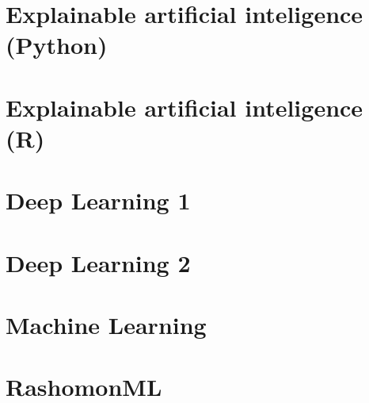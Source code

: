 \documentclass[
]{krantz}
\begin{document}
\hypertarget{explainable-artificial-inteligence-python}{%
\section{Explainable artificial inteligence (Python)}\label{explainable-artificial-inteligence-python}}

\hypertarget{explainable-artificial-inteligence-r}{%
\section{Explainable artificial inteligence (R)}\label{explainable-artificial-inteligence-r}}

\hypertarget{deep-learning-1}{%
\section{Deep Learning 1}\label{deep-learning-1}}

\hypertarget{deep-learning-2}{%
\section{Deep Learning 2}\label{deep-learning-2}}

\hypertarget{machine-learning}{%
\section{Machine Learning}\label{machine-learning}}

\hypertarget{rashomonml}{%
\section{RashomonML}\label{rashomonml}}

  
\end{document}
